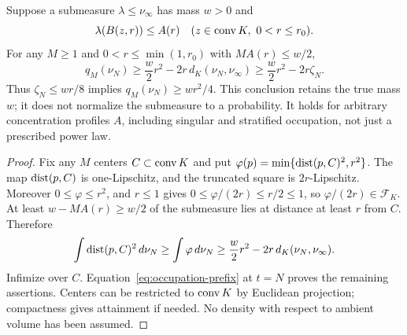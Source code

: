 \begin{theorem}\label{thm:resolution}
Suppose a submeasure $\lambda\le\nu_\infty$ has mass $w>0$ and
\[
 \lambda(B(z,r))\le A(r)
 \quad(z\in\operatorname{conv} K,
       \ 0<r\le r_0).
\]
For any $M\ge1$ and $0<r\le\min(1,r_0)$ with $M A(r)\le w/2$,
\begin{equation}\label{eq:local-mass}
 q_M(\nu_N)\ge\frac w2r^2-2r\,d_K(\nu_N,\nu_\infty)
              \ge\frac w2r^2-2r\zeta_N.
\end{equation}
Thus $\zeta_N\le wr/8$ implies $q_M(\nu_N)\ge wr^2/4$. This conclusion retains the true mass $w$; it does not normalize the submeasure to a probability. It holds for arbitrary concentration profiles $A$, including singular and stratified occupation, not just a prescribed power law.
\end{theorem}
\begin{proof}
Fix any $M$ centers $C\subset\operatorname{conv} K$ and put
$\varphi(p)=\min\{\operatorname{dist}(p,C)^2,r^2\}$. The map $\operatorname{dist}(p,C)$ is one-Lipschitz, and the truncated square is $2r$-Lipschitz. Moreover $0\le\varphi\le r^2$, and $r\le1$ gives $0\le\varphi/(2r)\le r/2\le1$, so $\varphi/(2r)\in\mathcal F_K$. At least $w-MA(r)\ge w/2$ of the submeasure lies at distance at least $r$ from $C$. Therefore
\[
 \int\operatorname{dist}(p,C)^2\,d\nu_N
 \ge\int\varphi\,d\nu_N
 \ge\frac w2r^2-2r\,d_K(\nu_N,\nu_\infty).
\]
Infimize over $C$. Equation~\eqref{eq:occupation-prefix} at $t=N$ proves the remaining assertions. Centers can be restricted to $\operatorname{conv} K$ by Euclidean projection; compactness gives attainment if needed. No density with respect to ambient volume has been assumed.
\end{proof}

